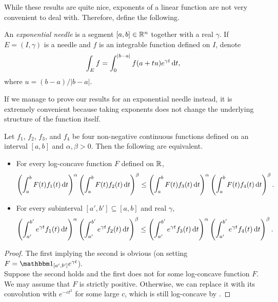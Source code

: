 While these results are quite nice, exponents of a linear function are not very convenient to deal with. Therefore, define the following.

\begin{definition}
	An \textit{exponential needle} is a segment $[a,b]\in\mathbb{R}^n$ together with a real $\gamma$. If $E=(I,\gamma)$ is a needle and $f$ is an integrable function defined on $I$, denote
	\[ \int_E f = \int_{0}^{|b-a|} f(a+tu)e^{\gamma t} \operatorname{d}\!{t}, \]
	where $u=(b-a)/|b-a|$.
\end{definition}

If we manage to prove our results for an exponential needle instead, it is extremely convenient because taking exponents does not change the underlying structure of the function itself.

\begin{theorem}
	Let $f_1$, $f_2$, $f_3$, and $f_4$ be four non-negative continuous functions defined on an interval $[a,b]$ and $\alpha,\beta>0$. Then the following are equivalent.
	\begin{itemize}
		\item For every log-concave function $F$ defined on $\mathbb{R}$, 
		\[ \left(\int_a^b F(t)f_1(t)\operatorname{d}\!{t}\right)^\alpha \left(\int_a^b F(t)f_2(t)\operatorname{d}\!{t}\right)^\beta \leq \left(\int_a^b F(t)f_3(t)\operatorname{d}\!{t}\right)^\alpha \left(\int_a^b F(t)f_4(t)\operatorname{d}\!{t}\right)^\beta. \]

		\item For every subinterval $[a',b']\subseteq[a,b]$ and real $\gamma$,
		\[ \left(\int_{a'}^{b'} e^{\gamma t}f_1(t)\operatorname{d}\!{t}\right)^\alpha \left(\int_{a'}^{b'} e^{\gamma t}f_2(t)\operatorname{d}\!{t}\right)^\beta \leq \left(\int_{a'}^{b'} e^{\gamma t}f_3(t)\operatorname{d}\!{t}\right)^\alpha \left(\int_{a'}^{b'} e^{\gamma t}f_4(t)\operatorname{d}\!{t}\right)^\beta. \]
	\end{itemize}
\end{theorem}

\begin{proof}
	The first implying the second is obvious (on setting $F=\indic_{[a',b']}e^{\gamma t}$).\\
	Suppose the second holds and the first does not for some log-concave function $F$. We may assume that $F$ is strictly positive. Otherwise, we can replace it with its convolution with $e^{-ct^2}$ for some large $c$, which is still log-concave by .
\end{proof}